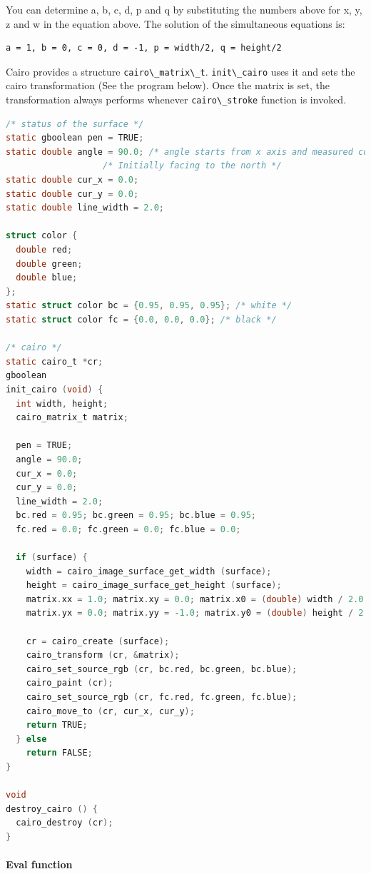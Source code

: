 You can determine a, b, c, d, p and q by substituting the numbers above
for x, y, z and w in the equation above. The solution of the
simultaneous equations is:

\begin{lstlisting}
a = 1, b = 0, c = 0, d = -1, p = width/2, q = height/2
\end{lstlisting}

Cairo provides a structure \passthrough{\lstinline!cairo\_matrix\_t!}.
\passthrough{\lstinline!init\_cairo!} uses it and sets the cairo
transformation (See the program below). Once the matrix is set, the
transformation always performs whenever
\passthrough{\lstinline!cairo\_stroke!} function is invoked.

\begin{lstlisting}[language=C]
/* status of the surface */
static gboolean pen = TRUE;
static double angle = 90.0; /* angle starts from x axis and measured counterclockwise */
                   /* Initially facing to the north */
static double cur_x = 0.0;
static double cur_y = 0.0;
static double line_width = 2.0;

struct color {
  double red;
  double green;
  double blue;
};
static struct color bc = {0.95, 0.95, 0.95}; /* white */
static struct color fc = {0.0, 0.0, 0.0}; /* black */

/* cairo */
static cairo_t *cr;
gboolean
init_cairo (void) {
  int width, height;
  cairo_matrix_t matrix;

  pen = TRUE;
  angle = 90.0;
  cur_x = 0.0;
  cur_y = 0.0;
  line_width = 2.0;
  bc.red = 0.95; bc.green = 0.95; bc.blue = 0.95;
  fc.red = 0.0; fc.green = 0.0; fc.blue = 0.0;

  if (surface) {
    width = cairo_image_surface_get_width (surface);
    height = cairo_image_surface_get_height (surface);
    matrix.xx = 1.0; matrix.xy = 0.0; matrix.x0 = (double) width / 2.0;
    matrix.yx = 0.0; matrix.yy = -1.0; matrix.y0 = (double) height / 2.0;

    cr = cairo_create (surface);
    cairo_transform (cr, &matrix);
    cairo_set_source_rgb (cr, bc.red, bc.green, bc.blue);
    cairo_paint (cr);
    cairo_set_source_rgb (cr, fc.red, fc.green, fc.blue);
    cairo_move_to (cr, cur_x, cur_y);
    return TRUE;
  } else
    return FALSE;
}

void
destroy_cairo () {
  cairo_destroy (cr);
}
\end{lstlisting}

\hypertarget{eval-function}{%
\paragraph{Eval function}\label{eval-function}}

